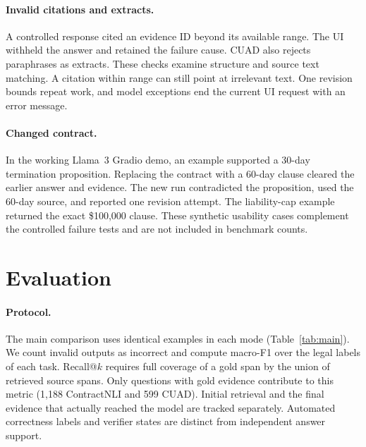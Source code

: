 \documentclass{article}
\begin{document}
\paragraph{Invalid citations and extracts.} A controlled response cited an evidence ID beyond its available range. The UI withheld the answer and retained the failure cause. CUAD also rejects paraphrases as extracts. These checks examine structure and source text matching. A citation within range can still point at irrelevant text. One revision bounds repeat work, and model exceptions end the current UI request with an error message.

\paragraph{Changed contract.} In the working Llama~3 Gradio demo, an example supported a 30-day termination proposition. Replacing the contract with a 60-day clause cleared the earlier answer and evidence. The new run contradicted the proposition, used the 60-day source, and reported one revision attempt. The liability-cap example returned the exact \$100,000 clause. These synthetic usability cases complement the controlled failure tests and are not included in benchmark counts.

\section{Evaluation}
\paragraph{Protocol.} The main comparison uses identical examples in each mode (Table~\ref{tab:main}). We count invalid outputs as incorrect and compute macro-F1 over the legal labels of each task. Recall@\(k\) requires full coverage of a gold span by the union of retrieved source spans. Only questions with gold evidence contribute to this metric (1,188 ContractNLI and 599 CUAD). Initial retrieval and the final evidence that actually reached the model are tracked separately. Automated correctness labels and verifier states are distinct from independent answer support.
\end{document}
